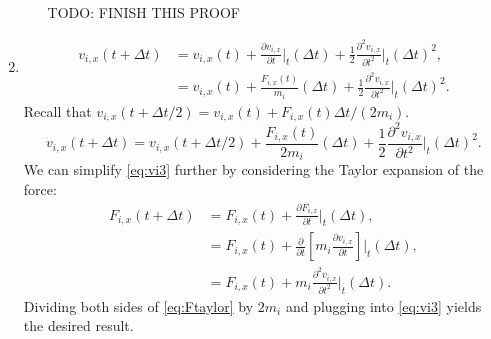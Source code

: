 \documentclass{article}
\begin{document}
\begin{enumerate}[label=\alph*)]
\begin{enumerate}[label=\roman*]
\begin{align*}
        \end{align*}
        TODO: FINISH THIS PROOF
    \end{enumerate}
  \item \begin{align*}
      v_{i,x}(t + \Delta t) & = v_{i,x}(t) + \frac{\partial v_{i,x}}{\partial t}\Bigr|_{t} (\Delta t) + \frac{1}{2} \frac{\partial^2 v_{i,x}}{\partial t^2}\Bigr|_{t} (\Delta t)^2, \\
                            & = v_{i,x}(t) + \frac{F_{i,x}(t)}{m_i} (\Delta t) + \frac{1}{2} \frac{\partial^2 v_{i,x}}{\partial t^2}\Bigr|_{t} (\Delta t)^2.
    \end{align*}
    Recall that $v_{i,x}(t + \Delta t / 2) = v_{i,x}(t) + F_{i,x}(t) \Delta t/(2m_i)$.
    \begin{equation} \label{eq:vi3}
      v_{i,x}(t + \Delta t) = v_{i,x}(t + \Delta t / 2) + \frac{F_{i,x}(t)}{2m_i}(\Delta t) + \frac{1}{2} \frac{\partial^2 v_{i,x}}{\partial t^2}\Bigr|_{t} (\Delta t)^2.
    \end{equation}
    We can simplify \eqref{eq:vi3} further by considering the Taylor expansion of the force:
    \begin{align}
    F_{i,x}(t + \Delta t) & = F_{i,x}(t) + \frac{\partial F_{i,x}}{\partial t}\Bigr|_{t} (\Delta t), \\
                          & = F_{i,x}(t) + \frac{\partial}{\partial t}\left[m_i \frac{\partial v_{i,x}}{\partial t}\right]\Bigr|_{t} (\Delta t), \\
      \label{eq:Ftaylor} & = F_{i,x}(t) + m_i \frac{\partial^2 v_{i,x}}{\partial t^2}\Bigr|_{t}(\Delta t).
    \end{align}
    Dividing both sides of \eqref{eq:Ftaylor} by $2m_i$ and plugging into \eqref{eq:vi3} yields the desired result.
\end{enumerate}
\end{document}
